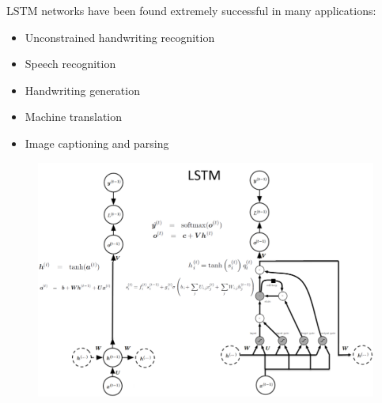 LSTM networks have been found extremely successful in many applications:
\begin{itemize}
	\item Unconstrained handwriting recognition
	\item Speech recognition
	\item Handwriting generation
	\item Machine translation
	\item Image captioning and parsing
\end{itemize}
\begin{figure}[H]
	\centering
	\includegraphics[width=0.9\linewidth]{images/lstm2.PNG}
\end{figure}
